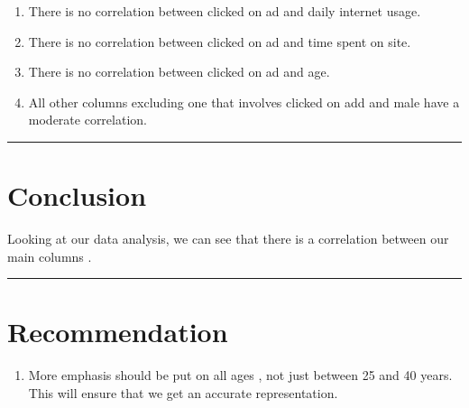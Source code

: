\documentclass[
]{article}
\providecommand{\tightlist}{%
  \setlength{\itemsep}{0pt}\setlength{\parskip}{0pt}}
\begin{document}
\begin{enumerate}
\def\labelenumi{\arabic{enumi}.}
\tightlist
\item
  There is no correlation between clicked on ad and daily internet
  usage.
\item
  There is no correlation between clicked on ad and time spent on site.
\item
  There is no correlation between clicked on ad and age.
\item
  All other columns excluding one that involves clicked on add and male
  have a moderate correlation.
\end{enumerate}

\begin{center}\rule{0.5\linewidth}{0.5pt}\end{center}

\hypertarget{conclusion}{%
\section{Conclusion}\label{conclusion}}

Looking at our data analysis, we can see that there is a correlation
between our main columns .

\begin{center}\rule{0.5\linewidth}{0.5pt}\end{center}

\hypertarget{recommendation}{%
\section{Recommendation}\label{recommendation}}

\begin{enumerate}
\def\labelenumi{\arabic{enumi}.}
\tightlist
\item
  More emphasis should be put on all ages , not just between 25 and 40
  years. This will ensure that we get an accurate representation.
\end{enumerate}
\end{document}
